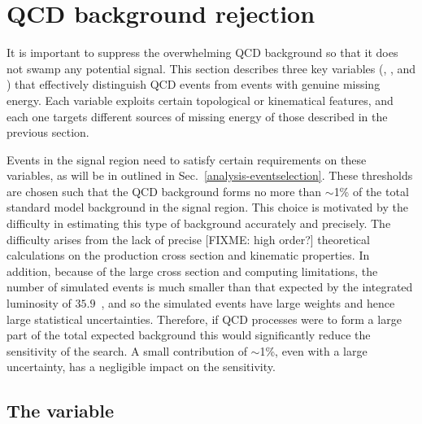 \section{QCD background rejection}

It is important to suppress the overwhelming QCD background so that it does not 
swamp any potential signal. This section describes three key variables 
(\alphat, \bdphi, and \mhtmet) that effectively distinguish QCD events from 
events with genuine missing energy. Each variable exploits certain topological 
or kinematical features, and each one targets different sources of missing 
energy of those described in the previous section.

Events in the signal region need to satisfy certain requirements on these 
variables, as will be in outlined in Sec.~\ref{analysis-eventselection}. These 
thresholds are chosen such that the QCD background forms no more than $\sim$1\% 
of the total standard model background in the signal region. This choice is 
motivated by the difficulty in estimating this type of background accurately 
and precisely. The difficulty arises from the lack of precise [FIXME: high 
order?] theoretical calculations on the production cross section and kinematic 
properties. 
In addition, because of the large cross section and computing limitations, the 
number of simulated events is much smaller than that expected by the integrated 
luminosity of $35.9$~\ifb, and so the simulated events have large weights and 
hence large statistical uncertainties.
Therefore, if QCD processes were to form a large part of the total expected 
background this would significantly reduce the sensitivity of the search. A 
small contribution of $\sim$1\%, even with a large uncertainty, has a 
negligible impact on the sensitivity.


\subsection{The \alphat variable}

